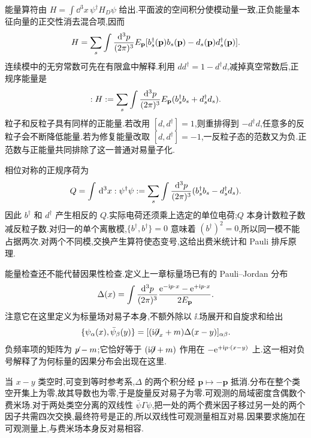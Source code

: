 
能量算符由 $H=\int\dd^3x\,\psi^\dagger H_D\psi$ 给出.平面波的空间积分使模动量一致,正负能量本征向量的正交性消去混合项,因而
\begin{equation}
 H=\sum_s\intp E_{\mathbf p}
 [b_s^\dagger(\mathbf p)b_s(\mathbf p)
       -d_s(\mathbf p)d_s^\dagger(\mathbf p)].
\end{equation}
连续模中的无穷常数可先在有限盒中解释.利用 $dd^\dagger=1-d^\dagger d$,减掉真空常数后,正规序能量是
\begin{equation}
 :H:=\sum_s\intp E_{\mathbf p}(b_s^\dagger b_s+d_s^\dagger d_s).
 \label{eq:dirac-positive-energy}
\end{equation}
粒子和反粒子具有同样的正能量.若改用 $[d,d^\dagger]=1$,则重排得到 $-d^\dagger d$,任意多的反粒子会不断降低能量.若为修复能量改取 $[d,d^\dagger]=-1$,一反粒子态的范数又为负.正范数与正能量共同排除了这一普通对易量子化.

相位对称的正规序荷为
\begin{equation}
 Q=\int\dd^3x:\psi^\dagger\psi:
 =\sum_s\intp(b_s^\dagger b_s-d_s^\dagger d_s).
\end{equation}
因此 $b^\dagger$ 和 $d^\dagger$ 产生相反的 $Q$.实际电荷还须乘上选定的单位电荷;$Q$ 本身计数粒子数减反粒子数.对归一的单个离散模,$\{b^\dagger,b^\dagger\}=0$ 意味着 $(b^\dagger)^2=0$,所以同一模不能占据两次.对两个不同模,交换产生算符使态变号,这给出费米统计和 Pauli 排斥原理.


能量检查还不能代替因果性检查.定义上一章标量场已有的 Pauli--Jordan 分布
\begin{equation}
 \Delta(x)=\intp\frac{\e^{-\ii p\cdot x}-\e^{+\ii p\cdot x}}{2E_{\mathbf p}}.
\end{equation}
注意它在这里定义为标量场对易子本身,不额外除以 $\ii$.场展开和自旋求和给出
\begin{equation}
 \{\psi_\alpha(x),\bar\psi_\beta(y)\}
 =[ (\ii\slashed{\partial}_x+m)\Delta(x-y)]_{\alpha\beta}.
 \label{eq:dirac-locality}
\end{equation}
负频率项的矩阵为 $\slashed p-m$;它恰好等于 $(\ii\slashed\partial+m)$ 作用在 $-\e^{+\ii p\cdot(x-y)}$ 上.这一相对负号解释了为何标量的因果分布会出现在这里.

当 $x-y$ 类空时,可变到等时参考系,$\Delta$ 的两个积分经 $\mathbf p\mapsto-\mathbf p$ 抵消.分布在整个类空开集上为零,故其导数也为零,于是旋量反对易子为零.可观测的局域密度含偶数个费米场.对于两处类空分离的双线性 $\bar\psi\Gamma\psi$,把一处的两个费米因子移过另一处的两个因子共需四次交换,最终符号是正的,所以双线性可观测量相互对易.因果要求施加在可观测量上,与费米场本身反对易相容.


